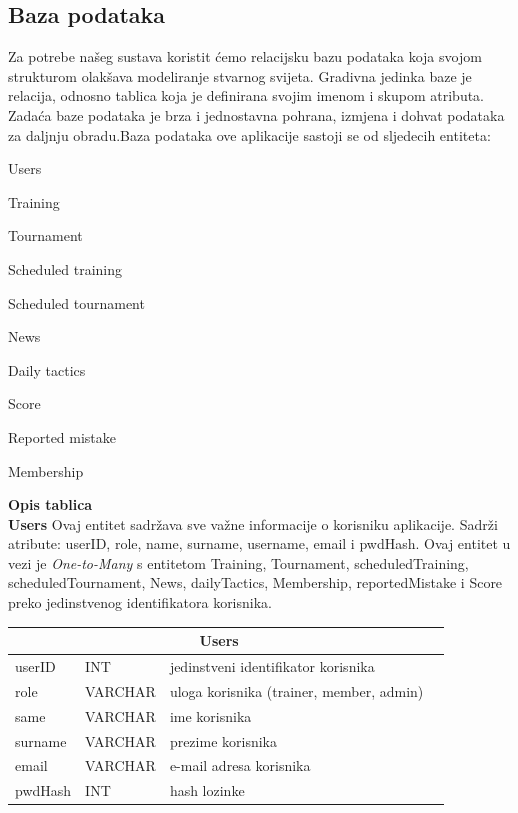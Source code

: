 \documentclass{article}
\begin{document}
		\eject
		\subsection{Baza podataka}
		Za potrebe našeg sustava koristit ćemo relacijsku bazu podataka koja svojom strukturom olakšava modeliranje stvarnog svijeta. Gradivna jedinka baze je relacija, odnosno tablica koja je definirana svojim imenom i skupom atributa. Zadaća baze podataka je brza i jednostavna pohrana, izmjena i dohvat podataka za daljnju obradu.Baza podataka ove aplikacije sastoji se od sljedecih entiteta:
		
			\begin{packed_item}
			
			\item {Users}
			\item  {Training} 
			\item  {Tournament}
			\item  {Scheduled training}
			\item  {Scheduled tournament}
			\item  {News}
			\item  {Daily tactics}
			\item  {Score}
			\item  {Reported mistake}
			\item  {Membership}
		\end{packed_item} 
		
	\large \textbf{Opis tablica}\\
	
	\textbf{Users} Ovaj entitet sadržava sve važne informacije o korisniku aplikacije. Sadrži atribute: userID, role, name, surname, username, email i pwdHash. Ovaj entitet u vezi je \textit{One-to-Many} s entitetom Training, Tournament, scheduledTraining, scheduledTournament, News, dailyTactics, Membership, reportedMistake i Score preko jedinstvenog identifikatora korisnika.
		
		
		
\setlength{\arrayrulewidth}{0.5mm}
\setlength{\tabcolsep}{10pt}
\renewcommand{\arraystretch}{1.5}		
		


	
	\begin{center}
    \begin{tabular}{ | l | l | l | p{5cm} |}
    \hline
    \multicolumn{3}{|c|}{Users}  \\ \hline
   \cellcolor{green!25}userID & INT & jedinstveni identifikator korisnika\\ \hline
    role & VARCHAR & uloga korisnika (trainer, member, admin)\\ \hline
    same & VARCHAR & ime korisnika \\ \hline
    surname & VARCHAR & prezime korisnika\\\hline
   email & VARCHAR & e-mail adresa korisnika\\ \hline
   pwdHash & INT & hash lozinke\\ \hline
    \end{tabular}
\end{center}
\eject
\end{document}

